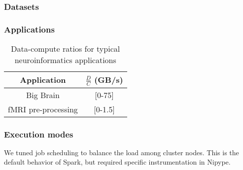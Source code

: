 \documentclass{IEEEtran}
\begin{document}
\subsubsection{Datasets} %


\subsubsection{Applications} %








\begin{table}
\centering
\begin{tabular}{c|c}
Application & $\frac{D}{C}$ (GB/s)\\
\hline
Big Brain            & [0-75] \\
fMRI pre-processing  & [0-1.5]
\end{tabular}
\label{table:applications}
\caption{Data-compute ratios for typical neuroinformatics applications}
\end{table}

\subsubsection{Execution modes} %

We tuned job scheduling to balance the load among
cluster nodes. This is the default behavior of Spark, but required
specific instrumentation in Nipype.


\end{document}
